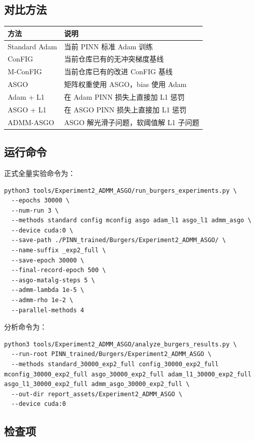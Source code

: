 \documentclass[UTF8,a4paper,12pt,fontset=none]{ctexart}
\begin{document}
\subsection{对比方法}

\begingroup
\small
\begin{longtable}{p{}p{}}
\toprule
方法 & 说明 \\
\midrule
Standard Adam & 当前 PINN 标准 Adam 训练 \\
ConFIG & 当前仓库已有的无冲突梯度基线 \\
M-ConFIG & 当前仓库已有的改进 ConFIG 基线 \\
ASGO & 矩阵权重使用 ASGO，bias 使用 Adam \\
Adam + L1 & 在 Adam PINN 损失上直接加 L1 惩罚 \\
ASGO + L1 & 在 ASGO PINN 损失上直接加 L1 惩罚 \\
ADMM-ASGO & ASGO 解光滑子问题，软阈值解 L1 子问题 \\
\bottomrule
\end{longtable}
\endgroup


\subsection{运行命令}

正式全量实验命令为：

\begin{lstlisting}
python3 tools/Experiment2_ADMM_ASGO/run_burgers_experiments.py \
  --epochs 30000 \
  --num-run 3 \
  --methods standard config mconfig asgo adam_l1 asgo_l1 admm_asgo \
  --device cuda:0 \
  --save-path ./PINN_trained/Burgers/Experiment2_ADMM_ASGO/ \
  --name-suffix _exp2_full \
  --save-epoch 30000 \
  --final-record-epoch 500 \
  --asgo-matalg-steps 5 \
  --admm-lambda 1e-5 \
  --admm-rho 1e-2 \
  --parallel-methods 4
\end{lstlisting}

分析命令为：

\begin{lstlisting}
python3 tools/Experiment2_ADMM_ASGO/analyze_burgers_results.py \
  --run-root PINN_trained/Burgers/Experiment2_ADMM_ASGO \
  --methods standard_30000_exp2_full config_30000_exp2_full mconfig_30000_exp2_full asgo_30000_exp2_full adam_l1_30000_exp2_full asgo_l1_30000_exp2_full admm_asgo_30000_exp2_full \
  --out-dir report_assets/Experiment2_ADMM_ASGO \
  --device cuda:0
\end{lstlisting}

\subsection{检查项}
\end{document}
